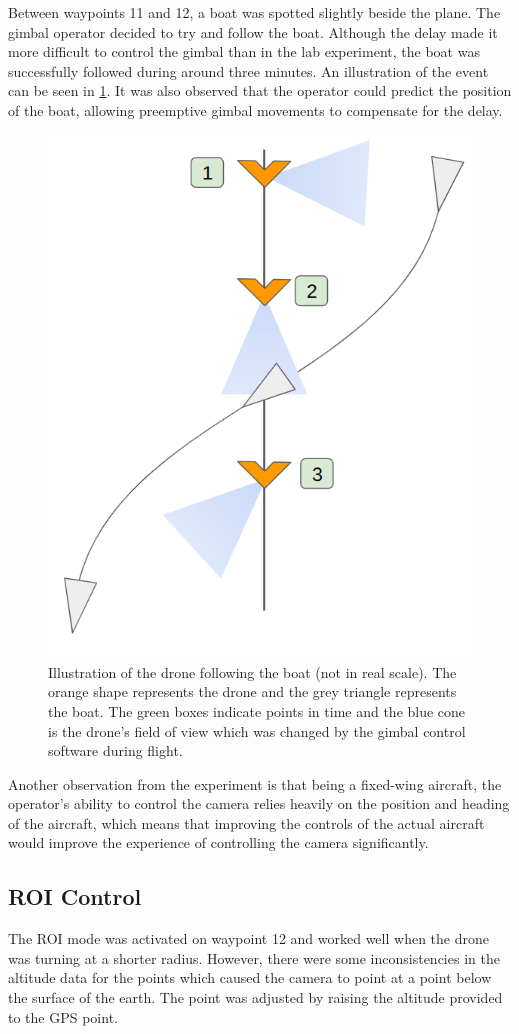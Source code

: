 \documentclass[nofilelist]{cslthse-msc}
\begin{document}
Between waypoints 11 and 12, a boat was spotted slightly beside the plane. The gimbal operator decided to try and follow the boat. Although the delay made it more difficult to control the gimbal than in the lab experiment, the boat was successfully followed during around three minutes. An illustration of the event can be seen in \ref{fig:boat-follow}. It was also observed that the operator could predict the position of the boat, allowing preemptive gimbal movements to compensate for the delay. 

\begin{figure}[htp]
   \centering
   \includegraphics[width=.5\textwidth]{images/drone-boat-illustration.png}
   \caption{Illustration of the drone following the boat (not in real scale). The orange shape represents the drone and the grey triangle represents the boat. The green boxes indicate points in time and the blue cone is the drone's field of view which was changed by the gimbal control software during flight.}
   \label{fig:boat-follow}
\end{figure}

Another observation from the experiment is that being a fixed-wing aircraft, the operator's ability to control the camera relies heavily on the position and heading of the aircraft, which means that improving the controls of the actual aircraft would improve the experience of controlling the camera significantly. 

\subsection{ROI Control}
The ROI mode was activated on waypoint 12 and worked well when the drone was turning at a shorter radius. However, there were some inconsistencies in the altitude data for the points which caused the camera to point at a point below the surface of the earth. The point was adjusted by raising the altitude provided to the GPS point. 
\end{document}
